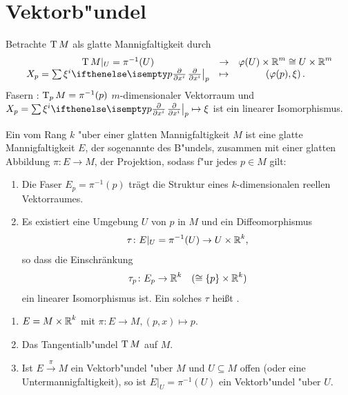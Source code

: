 \chapter{Vektorb"undel}

Betrachte $\operatorname{T} M$ als glatte Mannigfaltigkeit durch
	\[ \begin{array}{ccc} \T M|_U = \pi^{-1}(U) &\to& \varphi(U) \times \R^m \cong U \times \R^m \\
		X_p = \sum \xi^i\pdifffrac[p]{}{x^i} &\mapsto& \left(\varphi(p),\xi\right). \end{array} \]
Fasern : $\operatorname{T}_pM = \pi^{-1}(p)$ $m$-dimensionaler Vektorraum und $X_p = \sum \xi^i \pdifffrac[p]{}{x^i} \mapsto \xi$ ist ein linearer Isomorphismus.

\begin{Dfn}
  Ein  vom Rang $k$ "uber einer glatten Mannigfaltigkeit $M$ ist eine glatte Mannigfaltigkeit $E$, der sogenannte  des B"undels, zusammen mit einer glatten Abbildung $\pi \colon E \to M$, der Projektion, sodass f"ur jedes $p \in M$ gilt:
  \begin{enumerate}[label=(\roman*)]
  \item Die Faser $E_p = \pi^{-1}(p)$ trägt die Struktur eines $k$-dimensionalen reellen Vektorraumes.
  \item Es existiert eine Umgebung $U$ von $p$ in $M$ und ein Diffeomorphismus
    \begin{align*}
      \tau \colon E|_U = \pi^{-1}(U) \to U \times \operatorname{\mathbb{R}}^k,
    \end{align*}
    so dass die Einschränkung
    \begin{align*}
      \tau_p \colon E_p \to \operatorname{\mathbb{R}}^k \quad ( \cong \{p\} \times \operatorname{\mathbb{R}}^k)
    \end{align*}
    ein linearer Isomorphismus ist.
    Ein solches $\tau$ heißt .
  \end{enumerate}
\end{Dfn}

\begin{bsp}
  \begin{enumerate}[label=(\arabic*)]
  \item $E = M \times \operatorname{\mathbb{R}}^k$ mit $\pi \colon E \to M, (p,x) \mapsto p$.
  \item Das Tangentialb"undel $\operatorname{T} M$ auf $M$.
  \item Ist $E \xrightarrow{\pi} M$ ein Vektorb"undel "uber $M$ und $U \subseteq M$ offen (oder eine Untermannigfaltigkeit), so ist $E|_U = \pi^{-1}(U)$ ein Vektorb"undel "uber $U$.
  \end{enumerate}
\end{bsp}

